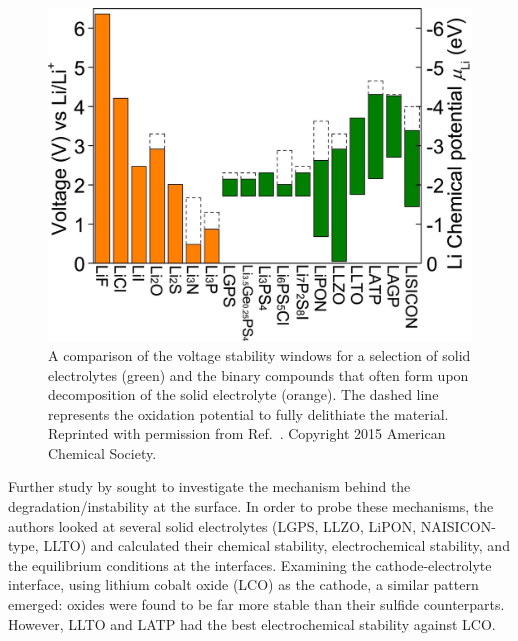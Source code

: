 \documentclass[../main.tex]{subfiles}
\begin{document}
\begin{figure}[H]
    \centering
    \includegraphics[scale=0.35]{figures/zhu2015_electrochemical_windows.png}
    \caption{A comparison of the voltage stability windows for a selection of solid electrolytes (green) and the binary compounds that often form upon decomposition of the solid electrolyte (orange). The dashed line represents the oxidation potential to fully delithiate the material. Reprinted with permission from Ref.~. Copyright 2015 American Chemical Society.}
    \label{fig:se_stab}
\end{figure}

Further study by \citeauthor{Zhu2016} sought to investigate the mechanism behind the degradation/instability at the surface.\cite{Zhu2016} In order to probe these mechanisms, the authors looked at several solid electrolytes (LGPS, LLZO, LiPON, NAISICON-type, LLTO) and calculated their chemical stability, electrochemical stability, and the equilibrium conditions at the interfaces. Examining the cathode-electrolyte interface, using lithium cobalt oxide (LCO) as the cathode, a similar pattern emerged: oxides were found to be far more stable than their sulfide counterparts. However, LLTO and LATP had the best electrochemical stability against LCO.
\end{document}
